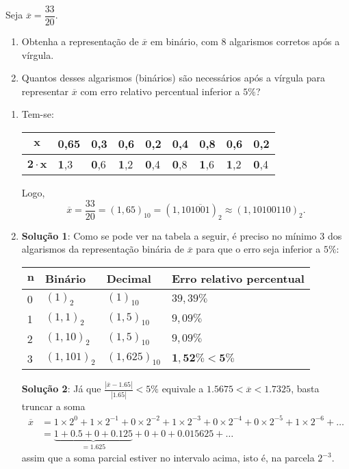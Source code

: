 \documentclass[12pt,a4paper]{article}
\begin{document}
\begin{ExerciseList}
\Exercise[title={2,5}] Seja $\overline{x} = \dfrac{33}{20}$.
\begin{enumerate}
\item Obtenha a representação de $\overline{x}$ em binário, com 8 algarismos corretos após a vírgula.
\item Quantos desses algarismos (binários) são necessários após a vírgula para representar $\overline{x}$ com erro relativo percentual inferior a $5\%$?
\end{enumerate}
\Answer
\begin{enumerate}
\item Tem-se:
\begin{center}
\begin{tabular}{|c|l|l|l|l|l|l|l|l|}
\hline
$\mathbf{x}$
& 0,65 & 0,3 & 0,6 & 0,2 & 0,4 & 0,8 & 0,6 & 0,2 \\ \hline
$\mathbf{2\cdot x}$
& \textbf{1},3  & \textbf{0},6 & \textbf{1},2 & \textbf{0},4 & \textbf{0},8 & \textbf{1},6 & \textbf{1},2 & \textbf{0},4 \\ \hline
\end{tabular}
\end{center}

Logo,
\[
\overline{x}
= \dfrac{33}{20}
= (1,65)_{10}
= (1,10\overline{1001})_2
\approx (1,10100110)_2.
\]
\item \textbf{Solução 1}: Como se pode ver na tabela a seguir, é preciso no mínimo 3 dos algarismos da representação binária de $\overline{x}$ para que o erro seja inferior a $5\%$:
\medskip
\begin{center}
\begin{tabular}{|l|l|l|l|}
\hline
  $\mathbf{n}$
& \textbf{Binário}
& \textbf{Decimal}
& \textbf{Erro relativo percentual} \\ \hline
0 & $(1)_2$     & $(1)_{10}$ & $39,39\%$ \\ \hline
1 & $(1,1)_2$   & $(1,5)_{10}$ & $9,09\%$ \\ \hline
2 & $(1,10)_2$  & $(1,5)_{10}$ & $9,09\%$ \\ \hline
3 & $(1,101)_2$ & $(1,625)_{10}$ & $\mathbf{1,52\% < 5\%}$ \\ \hline
\end{tabular}
\end{center}
\textbf{Solução 2}: Já que $\frac{|\overline{x} - 1.65|}{|1.65|} < 5 \%$ equivale a $1.5675< \overline{x} < 1.7325$, basta truncar a soma
\begin{align*}
\overline{x} & =
  1 \times 2^0
+ 1 \times 2^{-1}
+ 0 \times 2^{-2}
+ 1 \times 2^{-3}
+ 0 \times 2^{-4}
+ 0 \times 2^{-5}
+ 1 \times 2^{-6}
+ \ldots \\
& =
  \underbrace{1
+ 0.5
+ 0
+ 0.125}_{=1.625}
+ 0
+ 0
+ 0.015625
+ \ldots
\end{align*}
assim que a soma parcial estiver no intervalo acima, isto é, na parcela $2^{-3}$.
\end{enumerate}


\end{ExerciseList}
\end{document}
